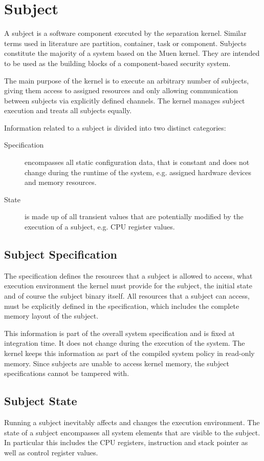 \section{Subject}\label{sec:design-subject}
A subject is a software component executed by the separation
kernel. Similar terms used in literature are partition, container, task or
component. Subjects constitute the majority of a system based on the Muen
kernel. They are intended to be used as the building blocks of a
component-based security system.

The main purpose of the kernel is to execute an arbitrary number of subjects,
giving them access to assigned resources and only allowing communication
between subjects via explicitly defined channels. The kernel
manages subject execution and treats all subjects equally.

Information related to a subject is divided into two distinct categories:

\begin{description}
	\item[Specification] encompasses all static configuration data, that is
		constant and does not change during the runtime of the system, e.g.
		assigned hardware devices and memory resources.
	\item[State] is made up of all transient values that are potentially
		modified by the execution of a subject, e.g. CPU register values.
\end{description}

\subsection{Subject Specification}
The specification defines the resources that a subject is allowed to access,
what execution environment the kernel must provide for the subject, the initial
state and of course the subject binary itself. All resources that a subject can
access, must be explicitly defined in the specification, which includes the
complete memory layout of the subject.

This information is part of the overall system specification and is fixed at integration time. It does not change during the
execution of the system. The kernel keeps this information as part of the
compiled system policy in read-only memory. Since subjects are unable to access
kernel memory, the subject specifications cannot be tampered with.

\subsection{Subject State}
Running a subject inevitably affects and changes the execution
environment. The state of a subject encompasses
all system elements that are visible to the subject. In particular this
includes the CPU registers, instruction and stack pointer as well as control
register values.

